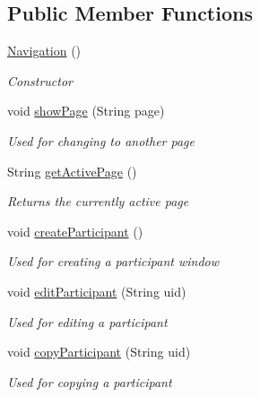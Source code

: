 \subsection*{Public Member Functions}
\begin{DoxyCompactItemize}
\item 
\hyperlink{class_web_analyzer_1_1_u_i_1_1_interaction_objects_1_1_navigation_a7a6fdf1d99ca8e22d46dd21b650ff529}{Navigation} ()
\begin{DoxyCompactList}\small\item\em Constructor \end{DoxyCompactList}\item 
void \hyperlink{class_web_analyzer_1_1_u_i_1_1_interaction_objects_1_1_navigation_aedf278dac5628e2fbcef79b93611bc20}{show\+Page} (String page)
\begin{DoxyCompactList}\small\item\em Used for changing to another page \end{DoxyCompactList}\item 
String \hyperlink{class_web_analyzer_1_1_u_i_1_1_interaction_objects_1_1_navigation_a1d1e06ac48815c242c36e9a15e02a829}{get\+Active\+Page} ()
\begin{DoxyCompactList}\small\item\em Returns the currently active page \end{DoxyCompactList}\item 
void \hyperlink{class_web_analyzer_1_1_u_i_1_1_interaction_objects_1_1_navigation_a59f689248cdb705afaae4c20a61dd932}{create\+Participant} ()
\begin{DoxyCompactList}\small\item\em Used for creating a participant window \end{DoxyCompactList}\item 
void \hyperlink{class_web_analyzer_1_1_u_i_1_1_interaction_objects_1_1_navigation_aa314aff618ac023f460a95c3a9b67268}{edit\+Participant} (String uid)
\begin{DoxyCompactList}\small\item\em Used for editing a participant \end{DoxyCompactList}\item 
void \hyperlink{class_web_analyzer_1_1_u_i_1_1_interaction_objects_1_1_navigation_aaa59afc9d203298ad07213879677ead7}{copy\+Participant} (String uid)
\begin{DoxyCompactList}\small\item\em Used for copying a participant \end{DoxyCompactList}\item 

\end{DoxyCompactItemize}
